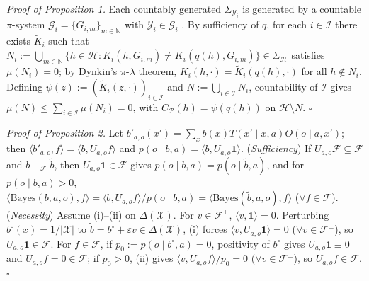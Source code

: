 \documentclass[11pt,letterpaper]{article}
\begin{document}
\emph{Proof of Proposition 1.} Each countably generated
\(\Sigma_{\mathcal{Y}_i}\) is generated by a countable \(\pi\)-system
\(\mathcal{G}_i = \{G_{i,m}\}_{m\in\mathbb{N}}\) with
\(\mathcal{Y}_i \in \mathcal{G}_i\) \citep{kallenberg2021}. By
sufficiency of \(q\), for each \(i \in \mathcal{I}\) there exists
\(\widetilde{K}_i\) such that
\(N_i := \bigcup_{m\in\mathbb{N}} \{h \in \mathcal{H} : K_i(h, G_{i,m}) \neq \widetilde{K}_i(q(h), G_{i,m})\} \in \Sigma_{\mathcal{H}}\)
satisfies \(\mu(N_i) = 0\); by Dynkin's \(\pi\)-\(\lambda\) theorem,
\(K_i(h, \cdot) = \widetilde{K}_i(q(h), \cdot)\) for all
\(h \notin N_i\). Defining
\(\psi(z) := (\widetilde{K}_i(z, \cdot))_{i\in\mathcal{I}}\) and
\(N := \bigcup_{i\in\mathcal{I}} N_i\), countability of \(\mathcal{I}\)
gives \(\mu(N) \le \sum_{i\in\mathcal{I}} \mu(N_i) = 0\), with
\(C_{\mathcal{P}}(h) = \psi(q(h))\) on \(\mathcal{H}\setminus N\).
\(\square\)

\emph{Proof of Proposition 2.} Let
\(b'_{a,o}(x') = \sum_{x} b(x) T(x'\mid x,a) O(o\mid a,x')\); then
\(\langle b'_{a,o}, f\rangle = \langle b, U_{a,o}f\rangle\) and
\(p(o\mid b,a) = \langle b, U_{a,o}\mathbf{1}\rangle\).
(\emph{Sufficiency}) If \(U_{a,o}\mathcal{F} \subseteq \mathcal{F}\) and
\(b \equiv_{\mathcal{F}} \tilde{b}\), then
\(U_{a,o}\mathbf{1} \in \mathcal{F}\) gives
\(p(o\mid b,a) = p(o\mid \tilde{b},a)\), and for \(p(o\mid b,a) > 0\),
\(\langle \mathrm{Bayes}(b,a,o), f\rangle = \langle b, U_{a,o}f\rangle / p(o\mid b,a) = \langle \mathrm{Bayes}(\tilde{b},a,o), f\rangle\)
(\(\forall f \in \mathcal{F}\)). (\emph{Necessity}) Assume (i)--(ii) on
\(\Delta(\mathcal{X})\). For \(v \in \mathcal{F}^\perp\),
\(\langle v, \mathbf{1}\rangle = 0\). Perturbing
\(b^\circ(x) = 1/|\mathcal{X}|\) to
\(\tilde{b} = b^\circ + \varepsilon v \in \Delta(\mathcal{X})\), (i)
forces \(\langle v, U_{a,o}\mathbf{1}\rangle = 0\)
(\(\forall v \in \mathcal{F}^\perp\)), so
\(U_{a,o}\mathbf{1} \in \mathcal{F}\). For \(f \in \mathcal{F}\), if
\(p_0 := p(o\mid b^\circ, a) = 0\), positivity of \(b^\circ\) gives
\(U_{a,o}\mathbf{1} \equiv 0\) and \(U_{a,o}f = 0 \in \mathcal{F}\); if
\(p_0 > 0\), (ii) gives \(\langle v, U_{a,o}f\rangle / p_0 = 0\)
(\(\forall v \in \mathcal{F}^\perp\)), so \(U_{a,o}f \in \mathcal{F}\).
\(\square\)
\end{document}
